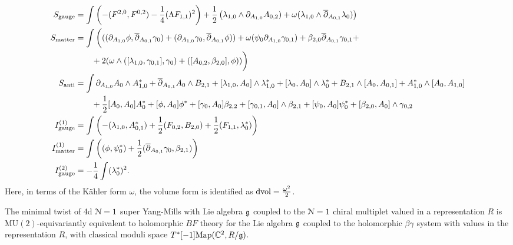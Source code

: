 \documentclass[10pt, oneside]{article}
\newcommand{\MU}{\mathrm{MU}}
\begin{document}
\begin{align*}
S_{\mathrm{gauge}} &= \int \left(-(F^{2, 0}, F^{0, 2}) - \frac{1}{4}(\Lambda F_{1, 1})^2\right) + \frac 12 \left(\lambda_{1,0} \wedge \partial_{A_{1,0}} A_{0,2}) + \omega (\lambda_{1,0} \wedge \overline{\partial}_{A_{0,1}} \lambda_0) \right)  \\
S_{\mathrm{matter}} &= \int \bigg( ((\partial_{A_{1,0}}\phi , \overline{\partial}_{A_{0,1}} \gamma_0) + (\partial_{A_{1,0}}\gamma_0, \overline{\partial}_{A_{0,1}} \phi)) + \omega (\psi_0 \partial_{A_{1,0}} \gamma_{0,1}) + \beta_{2,0} \overline{\partial}_{A_{0,1}} \gamma_{0,1}  + \\
&\qquad + 2 (\omega \wedge ([\lambda_{1,0}, \gamma_{0,1}] ,\gamma_{0}) + ([A_{0,2}, \beta_{2,0}], \phi) )   \bigg) \\
S_{\mathrm{anti}} &= \int \partial_{A_{1, 0}} A_0 \wedge A_{1,0}^* + \overline{\partial}_{A_{0, 1}} A_0\wedge B_{2,1} + [\lambda_{1,0}, A_0]\wedge \lambda_{1,0}^* +  [\lambda_{0}, A_0]\wedge \lambda_{0}^* +B_{2,1} \wedge [A_0, A_{0,1}] + A_{1,0}^* \wedge [A_{0}, A_{1,0}] \\
&\qquad + \frac{1}{2}[A_0, A_0]A_0^* + [\phi, A_0] \phi^* + [\gamma_0, A_0] \beta_{2,2} + [\gamma_{0,1}, A_0]\wedge \beta_{2,1} + [\psi_0, A_0] \psi_0^* + [\beta_{2,0}, A_0] \wedge \gamma_{0,2} \\
I^{(1)}_{\mathrm{gauge}} &=  \int  \left( - (\lambda_{1,0}, A_{0,1}^*) + \frac 12 (F_{0,2},B_{2,0}) + \frac 12 (F_{1,1}, \lambda_0^*)  \right)\\
I^{(1)}_{\mathrm{matter}} &=  \int  \left( (\phi, \psi_0^*) + \frac 12( \overline{\partial}_{A_{0,1}} \gamma_{0}, \beta_{2,1}) \right)\\
I^{(2)}_{\mathrm{gauge}} &= -\frac{1}{4}\int  (\lambda_0^*)^2.
\end{align*}
Here, in terms of the K\"ahler form $\omega$, the volume form is identified as $\operatorname{dvol} = \frac{\omega^2}2$.

\begin{thm} \label{4d_minimal_twist_thm}
The minimal twist of 4d $\mathcal N=1$ super Yang-Mills with Lie algebra $\mathfrak g$ coupled to the $\mathcal N=1$ chiral multiplet valued in a representation $R$ is $\MU(2)$-equivariantly equivalent to holomorphic $BF$ theory for the Lie algebra $\mathfrak g$ coupled to the holomorphic $\beta\gamma$ system with values in the representation $R$, with classical moduli space $T^*[-1]\mathrm{Map}(\mathbb C^2, R/\mathfrak{g})$. 
\end{thm}
\end{document}

